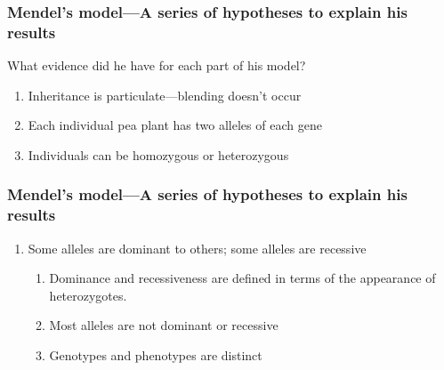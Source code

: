 \begin{frame}
    \frametitle{Mendel's model---A series of hypotheses to explain his results}
    What evidence did he have for each part of his model?

    \begin{enumerate}[<+->]
        \item Inheritance is particulate---blending doesn't occur
        \item Each individual pea plant has two alleles of each gene
        \item Individuals can be homozygous or heterozygous
    \end{enumerate}
\end{frame}

\begin{frame}
    \frametitle{Mendel's model---A series of hypotheses to explain his results}
    \begin{enumerate}[<+->]
        \item Some alleles are dominant to others; some alleles are recessive
            \begin{enumerate}[NOTE]
                \item Dominance and recessiveness are defined 
                    in terms of the appearance of heterozygotes.
                \item Most alleles are not dominant or recessive
                \item Genotypes and phenotypes are distinct
            \end{enumerate}
    \end{enumerate}

\end{frame}

